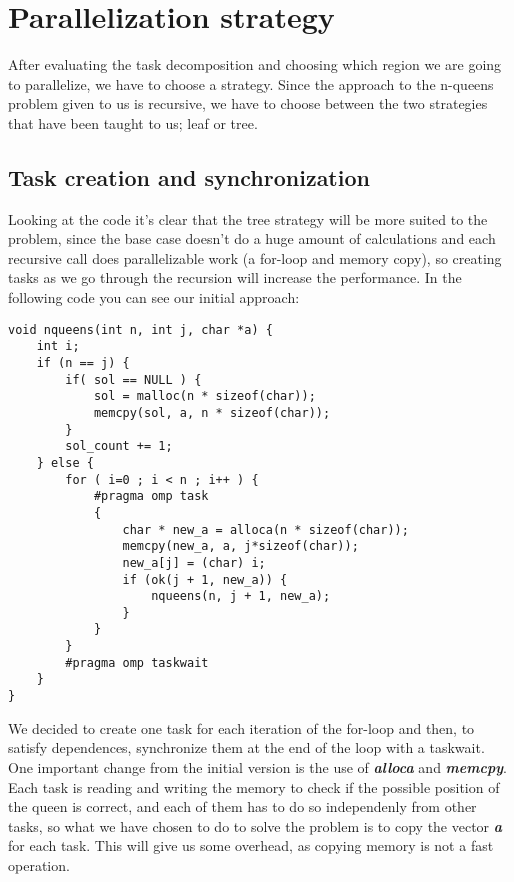 \section{Parallelization strategy}
\justify
After evaluating the task decomposition and choosing which region we are going to parallelize, we have to choose a strategy. Since the approach to the n-queens problem given to us is recursive, we have to choose between the two strategies that have been taught to us; leaf or tree.
\justify
\subsection{Task creation and synchronization}
Looking at the code it's clear that the tree strategy will be more suited to the problem, since the base case doesn't do a huge amount of calculations and each recursive call does parallelizable work (a for-loop and memory copy), so creating tasks as we go through the recursion will increase the performance.
\justify
In the following code you can see our initial approach:

\begin{lstlisting}
void nqueens(int n, int j, char *a) {
    int i;
    if (n == j) {
        if( sol == NULL ) {
            sol = malloc(n * sizeof(char));
            memcpy(sol, a, n * sizeof(char));
        }
        sol_count += 1;
    } else {
        for ( i=0 ; i < n ; i++ ) {
            #pragma omp task
            {
                char * new_a = alloca(n * sizeof(char));
                memcpy(new_a, a, j*sizeof(char));
                new_a[j] = (char) i;
                if (ok(j + 1, new_a)) {
                    nqueens(n, j + 1, new_a);
                }
            }
        }
        #pragma omp taskwait
    }
}
\end{lstlisting}
\justify
We decided to create one task for each iteration of the for-loop and then, to satisfy dependences, synchronize them at the end of the loop with a taskwait. One important change from the initial version is the use of \textbf{\textit{alloca}} and \textbf{\textit{memcpy}}. Each task is reading and writing the memory to check if the possible position of the queen is correct, and each of them has to do so independenly from other tasks, so what we have chosen to do to solve the problem is to copy the vector \textbf{\textit{a}} for each task. This will give us some overhead, as copying memory is not a fast operation.
\justify

